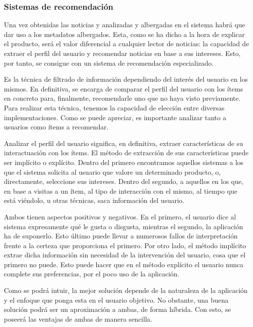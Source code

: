 \subsubsection{Sistemas de recomendación}
Una vez obtenidas las noticias y analizadas y albergadas en el sistema habrá que dar uso a los metadatos albergados. Esta, como se ha dicho a la hora de explicar el producto, será el valor diferencial a cualquier lector de noticias: la capacidad de extraer el perfil del usuario y recomendar noticias en base a sus intereses. Esto, por tanto, se consigue con un sistema de recomendación especializado.


Es la técnica de filtrado de información dependiendo del interés del usuario en los mismos. En definitiva, se encarga de comparar el perfil del usuario con los ítems en concreto para, finalmente, recomendarle uno que no haya visto previamente. Para realizar esta técnica, tenemos la capacidad de elección entre diversas implementaciones. Como se puede apreciar, es importante analizar tanto a usuarios como ítems a recomendar.

Analizar el perfil del usuario significa, en definitiva, extraer características de su interactuación con los ítems. El método de extracción de sus características puede ser implícito o explícito. Dentro del primero encontramos aquellos sistemas a los que el sistema solicita al usuario que valore un determinado producto, o, directamente, seleccione sus intereses. Dentro del segundo, a aquellos en los que, en base a visitas a un ítem, al tipo de interacción con el mismo, al tiempo que está viéndolo, u otras técnicas, saca información del usuario.

Ambos tienen aspectos positivos y negativos. En el primero, el usuario dice al sistema expresamente qué le gusta o disgusta, mientras el segundo, la aplicación ha de suponerlo. Esto último puede llevar a numerosos fallos de interpretación frente a la certeza que proporciona el primero. Por otro lado, el método implícito extrae dicha información sin necesidad de la intervención del usuario, cosa que el primero no puede. Esto puede hacer que en el método explícito el usuario nunca complete sus preferencias, por el poco uso de la aplicación.

Como se podrá intuir, la mejor solución depende de la naturaleza de la aplicación y el enfoque que ponga esta en el usuario objetivo. No obstante, una buena solución podrá ser un aproximación a ambas, de forma híbrida. Con esto, se poseerá las ventajas de ambas de manera sencilla.

